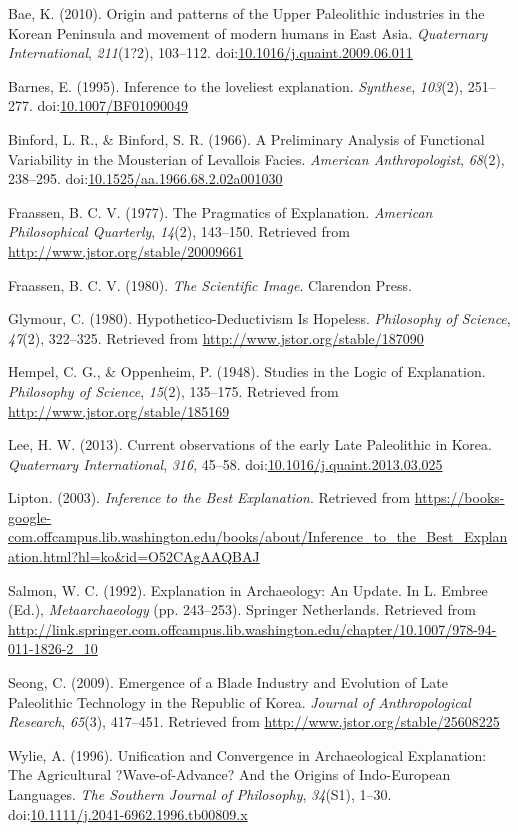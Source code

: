 \documentclass[american,man]{apa6}
\begin{document}
Bae, K. (2010). Origin and patterns of the Upper Paleolithic industries
in the Korean Peninsula and movement of modern humans in East Asia.
\emph{Quaternary International}, \emph{211}(1?2), 103--112.
doi:\href{http://dx.doi.org/10.1016/j.quaint.2009.06.011}{10.1016/j.quaint.2009.06.011}

Barnes, E. (1995). Inference to the loveliest explanation.
\emph{Synthese}, \emph{103}(2), 251--277.
doi:\href{http://dx.doi.org/10.1007/BF01090049}{10.1007/BF01090049}

Binford, L. R., \& Binford, S. R. (1966). A Preliminary Analysis of
Functional Variability in the Mousterian of Levallois Facies.
\emph{American Anthropologist}, \emph{68}(2), 238--295.
doi:\href{http://dx.doi.org/10.1525/aa.1966.68.2.02a001030}{10.1525/aa.1966.68.2.02a001030}

Fraassen, B. C. V. (1977). The Pragmatics of Explanation. \emph{American
Philosophical Quarterly}, \emph{14}(2), 143--150. Retrieved from
\url{http://www.jstor.org/stable/20009661}

Fraassen, B. C. V. (1980). \emph{The Scientific Image}. Clarendon Press.

Glymour, C. (1980). Hypothetico-Deductivism Is Hopeless.
\emph{Philosophy of Science}, \emph{47}(2), 322--325. Retrieved from
\url{http://www.jstor.org/stable/187090}

Hempel, C. G., \& Oppenheim, P. (1948). Studies in the Logic of
Explanation. \emph{Philosophy of Science}, \emph{15}(2), 135--175.
Retrieved from \url{http://www.jstor.org/stable/185169}

Lee, H. W. (2013). Current observations of the early Late Paleolithic in
Korea. \emph{Quaternary International}, \emph{316}, 45--58.
doi:\href{http://dx.doi.org/10.1016/j.quaint.2013.03.025}{10.1016/j.quaint.2013.03.025}

Lipton. (2003). \emph{Inference to the Best Explanation}. Retrieved from
\url{https://books-google-com.offcampus.lib.washington.edu/books/about/Inference_to_the_Best_Explanation.html?hl=ko\&id=O52CAgAAQBAJ}

Salmon, W. C. (1992). Explanation in Archaeology: An Update. In L.
Embree (Ed.), \emph{Metaarchaeology} (pp. 243--253). Springer
Netherlands. Retrieved from
\url{http://link.springer.com.offcampus.lib.washington.edu/chapter/10.1007/978-94-011-1826-2_10}

Seong, C. (2009). Emergence of a Blade Industry and Evolution of Late
Paleolithic Technology in the Republic of Korea. \emph{Journal of
Anthropological Research}, \emph{65}(3), 417--451. Retrieved from
\url{http://www.jstor.org/stable/25608225}

Wylie, A. (1996). Unification and Convergence in Archaeological
Explanation: The Agricultural ?Wave-of-Advance? And the Origins of
Indo-European Languages. \emph{The Southern Journal of Philosophy},
\emph{34}(S1), 1--30.
doi:\href{http://dx.doi.org/10.1111/j.2041-6962.1996.tb00809.x}{10.1111/j.2041-6962.1996.tb00809.x}
\end{document}
